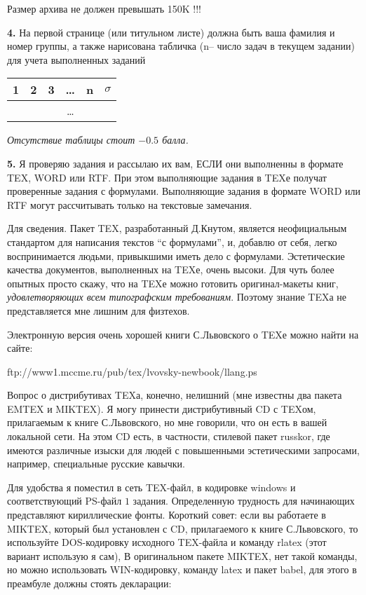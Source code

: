 \documentclass[10pt,twocolumn]{article}
\begin{document}
{{\huge Размер архива не должен превышать 150K !!!}


{\bf 4.} 
На  первой странице (или титульном листе) должна быть ваша фамилия и
номер группы, а также нарисована табличка  (n-- число задач в текущем
задании) для учета выполненных заданий
\begin{tabular}{|c|c|c|c|c|c|}
\hline
1&2&3&\dots&n&$\sigma$\\
\hline
&&&\dots&&\\
\hline
\end{tabular}

{\em Отсутствие таблицы стоит $-0.5$ балла.}

{\bf 5.} 
Я проверяю задания и рассылаю их вам, ЕСЛИ они выполненны в формате TEX, WORD или RTF. При этом 
выполняющие задания в TEXе получат проверенные
задания с формулами. Выполняющие задания в формате WORD или RTF могут рассчитывать только на текстовые
замечания. 

Для сведения. Пакет TEX, разработанный Д.Кнутом, является неофициальным 
стандартом для написания текстов ``с формулами'', и, добавлю от себя, 
легко воспринимается людьми, привыкшими иметь дело с формулами. Эстетические
качества документов, выполненных на TEXе, очень высоки. Для чуть более опытных просто
скажу, что на TEXе можно готовить оригинал-макеты книг, 
{\em удовлетворяющих всем типографским требованиям}. Поэтому знание TEXа
не представляется мне лишним для физтехов.

Электронную версия очень хорошей книги С.Львовского о TEXе можно найти на сайте:

ftp://www1.mccme.ru/pub/tex/lvovsky-newbook/llang.ps

Вопрос о дистрибутивах TEXа, конечно, нелишний (мне известны
два пакета EMTEX и MIKTEX). 
Я могу принести дистрибутивный CD с TEXом, прилагаемым к книге С.Львовского, но мне говорили, что
он есть в вашей локальной сети. На этом CD есть, в частности, стилевой пакет 
russkor, где имеются различные изыски для людей с повышенными эстетическими 
запросами, например, специальные русские кавычки. 

Для удобства я поместил в сеть TEX-файл, в кодировке windows и соответствующий PS-файл $1$ задания.
Определенную трудность для начинающих представляют кириллические фонты. Короткий совет:
если вы работаете в MIKTEX, который был установлен с CD, прилагаемого к книге С.Львовского,
то используйте DOS-кодировку исходного TEX-файла и команду rlatex (этот вариант использую я сам),
В оригинальном пакете MIKTEX, нет такой команды, но можно использовать WIN-кодировку, команду latex и пакет babel, для этого в преамбуле
должны стоять декларации:

}
\end{document}
